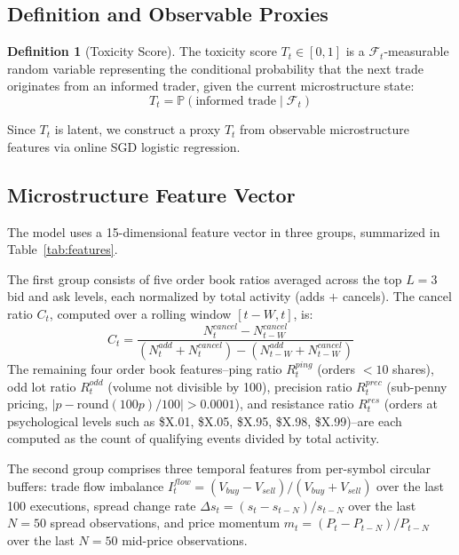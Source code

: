 \documentclass[11pt]{article}
\theoremstyle{definition}
\newtheorem{definition}{Definition}[section]
\begin{document}
\subsection{Definition and Observable Proxies}

\begin{definition}[Toxicity Score]
The toxicity score $T_t \in [0,1]$ is a $\mathcal{F}_t$-measurable random variable representing the conditional probability that the next trade originates from an informed trader, given the current microstructure state:
\begin{equation}
T_t = \mathbb{P}(\text{informed trade} \mid \mathcal{F}_t)
\end{equation}
\end{definition}

Since $T_t$ is latent, we construct a proxy $\hat{T}_t$ from observable microstructure features via online SGD logistic regression.

\subsection{Microstructure Feature Vector}

The model uses a 15-dimensional feature vector in three groups, summarized in Table~\ref{tab:features}.

The first group consists of five order book ratios averaged across the top $L = 3$ bid and ask levels, each normalized by total activity (adds $+$ cancels). The cancel ratio $C_t$, computed over a rolling window $[t-W, t]$, is:
\begin{equation}
C_t = \frac{N_t^{cancel} - N_{t-W}^{cancel}}{(N_t^{add} + N_t^{cancel}) - (N_{t-W}^{add} + N_{t-W}^{cancel})}
\end{equation}
The remaining four order book features--ping ratio $R_t^{ping}$ (orders $< 10$ shares), odd lot ratio $R_t^{odd}$ (volume not divisible by 100), precision ratio $R_t^{prec}$ (sub-penny pricing, $|p - \text{round}(100p)/100| > 0.0001$), and resistance ratio $R_t^{res}$ (orders at psychological levels such as \$X.01, \$X.05, \$X.95, \$X.98, \$X.99)--are each computed as the count of qualifying events divided by total activity.

The second group comprises three temporal features from per-symbol circular buffers: trade flow imbalance $I_t^{flow} = (V_{buy} - V_{sell}) / (V_{buy} + V_{sell})$ over the last 100 executions, spread change rate $\Delta s_t = (s_t - s_{t-N}) / s_{t-N}$ over the last $N = 50$ spread observations, and price momentum $m_t = (P_t - P_{t-N}) / P_{t-N}$ over the last $N = 50$ mid-price observations.
\end{document}
